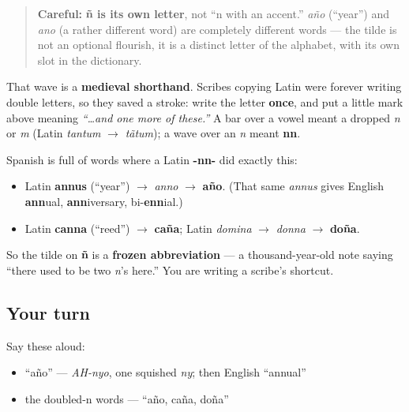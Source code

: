 \begin{quote}
\textbf{Careful:} \textbf{ñ is its own letter}, not \textquotedblleft{}n with an accent.\textquotedblright{} \emph{año} (\textquotedblleft{}year\textquotedblright{}) and \emph{ano} (a rather different word) are completely different words — the tilde is not an optional flourish, it is a distinct letter of the alphabet, with its own slot in the dictionary.
\end{quote}

\begin{culture}
That wave is a \textbf{medieval shorthand}. Scribes copying Latin were forever writing double letters, so they saved a stroke: write the letter \textbf{once}, and put a little mark above meaning \emph{\textquotedblleft{}…and one more of these.\textquotedblright{}} A bar over a vowel meant a dropped \emph{n} or \emph{m} (Latin \emph{tantum} $\to$ \emph{tãtum}); a wave over an \emph{n} meant \textbf{nn}.

Spanish is full of words where a Latin \textbf{-nn-} did exactly this:

\begin{itemize}
\raggedright
  \item Latin \textbf{annus} (\textquotedblleft{}year\textquotedblright{}) $\to$ \emph{anno} $\to$ \textbf{año}. (That same \emph{annus} gives English \textbf{ann}ual, \textbf{ann}iversary, bi-\textbf{enn}ial.)
  \item Latin \textbf{canna} (\textquotedblleft{}reed\textquotedblright{}) $\to$ \textbf{caña}; Latin \emph{domina} $\to$ \emph{donna} $\to$ \textbf{doña}.
\end{itemize}

So the tilde on \textbf{ñ} is a \textbf{frozen abbreviation} — a thousand-year-old note saying \textquotedblleft{}there used to be two \emph{n}'s here.\textquotedblright{} You are writing a scribe's shortcut.
\end{culture}

\subsection*{Your turn}
Say these aloud:

\begin{itemize}
\raggedright
  \item \textquotedblleft{}año\textquotedblright{} — \emph{AH-nyo}, one squished \emph{ny}; then English \textquotedblleft{}annual\textquotedblright{}
  \item the doubled-n words — \textquotedblleft{}año, caña, doña\textquotedblright{}
\end{itemize}


